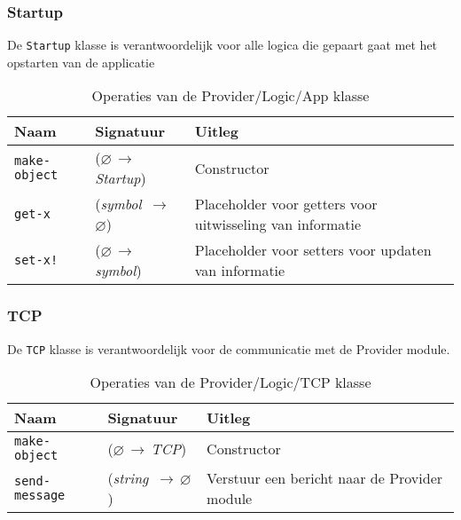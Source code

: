 \documentclass[a4paper, 11pt]{article}
\newcommand{\naar}{\,$\rightarrow$\,}
\renewcommand{\empty}{$\varnothing$}
\newcommand{\<}{\scriptsize\textless\normalsize}
\renewcommand{\>}{\scriptsize\textgreater\normalsize}
\begin{document}
\subsubsection{Startup} %
De \texttt{Startup} klasse is verantwoordelijk voor alle logica die gepaart gaat met het opstarten van de applicatie
\begin{table}[H]
	\begin{center}
		{
		\begin{tabular}{|l l l|}
			\hline
			\textbf{Naam} & \textbf{Signatuur} & \textbf{Uitleg}\\
			\hline
			\texttt{make-object} & (\empty \naar \textit{Startup}) & Constructor\\
			\hline
			\texttt{get-x} & (\textit{symbol} \naar \empty) & Placeholder voor getters voor uitwisseling van informatie\\
			\texttt{set-x!} & (\empty \naar \textit{symbol}) & Placeholder voor setters voor updaten van informatie\\
			\hline
		\end{tabular}}
		\caption{Operaties van de Provider/Logic/App klasse}
	\end{center}
\end{table}

\subsubsection{TCP} %
De \texttt{TCP} klasse is verantwoordelijk voor de communicatie met de Provider module.
\begin{table}[H]
	\begin{center}
		{
		\begin{tabular}{|l l l|}
			\hline
			\textbf{Naam} & \textbf{Signatuur} & \textbf{Uitleg}\\
			\hline
			\texttt{make-object} & (\empty \naar \textit{TCP}) & Constructor\\
			\hline
			\texttt{send-message} & (\textit{string} \naar \empty) & Verstuur een bericht naar de Provider module\\
			\hline
		\end{tabular}}
		\caption{Operaties van de Provider/Logic/TCP klasse}
	\end{center}
\end{table}
\end{document}
